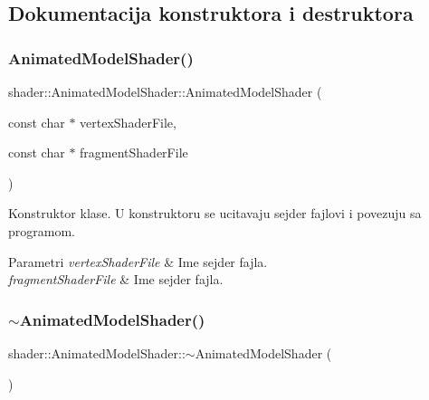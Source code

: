 \subsection{Dokumentacija konstruktora i destruktora}
\mbox{\label{classshader_1_1AnimatedModelShader_a4fefb7f1416c2b2cd10b043e13f1497f}} 
\subsubsection{\texorpdfstring{Animated\+Model\+Shader()}{AnimatedModelShader()}}
{\footnotesize\ttfamily shader\+::\+Animated\+Model\+Shader\+::\+Animated\+Model\+Shader (\begin{DoxyParamCaption}\item[{const char $\ast$}]{vertex\+Shader\+File,  }\item[{const char $\ast$}]{fragment\+Shader\+File }\end{DoxyParamCaption})}



Konstruktor klase. U konstruktoru se ucitavaju sejder fajlovi i povezuju sa programom. 


\begin{DoxyParams}{Parametri}
{\em vertex\+Shader\+File} & Ime sejder fajla. \\
\hline
{\em fragment\+Shader\+File} & Ime sejder fajla. \\
\hline
\end{DoxyParams}
\mbox{\label{classshader_1_1AnimatedModelShader_a289d4165e5c06f85051af03653d8ae6b}} 
\subsubsection{\texorpdfstring{$\sim$\+Animated\+Model\+Shader()}{~AnimatedModelShader()}}
{\footnotesize\ttfamily shader\+::\+Animated\+Model\+Shader\+::$\sim$\+Animated\+Model\+Shader (\begin{DoxyParamCaption}{ }\end{DoxyParamCaption})}



